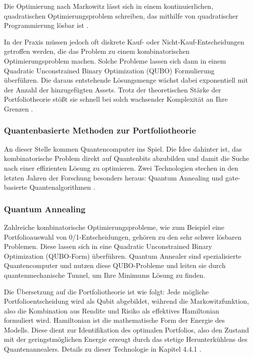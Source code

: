 Die Optimierung nach Markowitz lässt sich in einem kontinuierlichen, quadratischen Optimierungsproblem schreiben, das mithilfe von quadratischer Programmierung lösbar ist
\cite{Markowitz 1959}.

In der Praxis müssen jedoch oft diskrete Kauf- oder Nicht-Kauf-Entscheidungen getroffen werden, die das Problem zu einem kombinatorischen Optimierungsproblem machen. Solche Probleme lassen sich dann in einem Quadratic Unconstrained Binary Optimization (QUBO) Formulierung überführen. Die daraus entstehende Lösungsmenge wächst dabei exponentiell mit der Anzahl der hinzugefügten Assets.
Trotz der theoretischen Stärke der Portfoliotheorie stößt sie schnell bei solch wachsender Komplexität an Ihre Grenzen \cite{sakuler_real-world_2025, orus_quantum_2019}.

\subsubsection*{Quantenbasierte Methoden zur Portfoliotheorie}

An dieser Stelle kommen Quantencomputer ins Spiel. Die Idee dahinter ist, das kombinatorische Problem direkt auf Quantenbits abzubilden und damit die Suche nach einer effizienten Lösung zu optimieren. Zwei Technologien stechen in den letzten Jahren der Forschung besonders heraus: Quantum Annealing und gate-basierte Quantenalgorithmen \cite{mugel_dynamic_2022, orus_quantum_2019}.

\subsubsection*{Quantum Annealing}
 
Zahlreiche kombinatorische Optimierungsprobleme, wie zum Beispiel eine Portfolioauswahl von 0/1-Entscheidungen, gehören zu den sehr schwer lösbaren Problemen. Diese lassen sich in eine Quadratic Unconstrained Binary Optimization (QUBO-Form) überführen. Quantum Annealer sind spezialisierte Quantencomputer und nutzen diese QUBO-Probleme und leiten sie durch quantenmechanische Tunnel, um Ihre Minimums Lösung zu finden. 

Die Übersetzung auf die Portfoliotheorie ist wie folgt: Jede mögliche Portfolioentscheidung wird als Qubit abgebildet, während die Markowitzfunktion, also die Kombination aus Rendite und Risiko als effektives Hamiltonian formuliert wird. Hamiltonian ist die mathematische Form der Energie des Modells. Diese dient zur Identifikation des optimalen Portfolios, also den Zustand mit der geringstmöglichen Energie erzeugt durch das stetige Herunterkühlens des Quantenannealers. Details zu dieser Technologie in Kapitel 4.4.1 \cite{mugel_dynamic_2022}.
 
